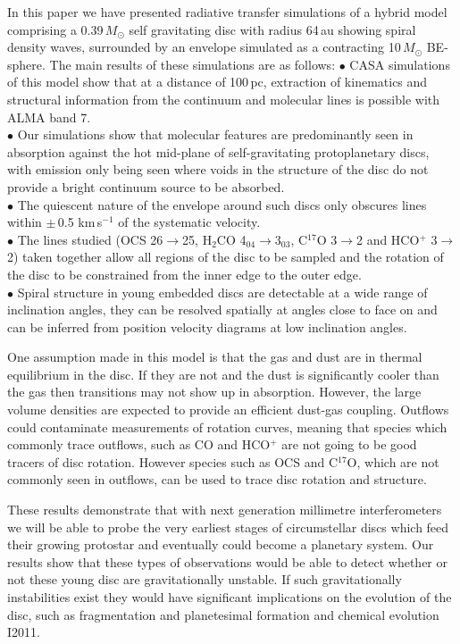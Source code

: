 \documentclass[useAMS,usenatbib]{mn2e}
\begin{document}
In this paper we have presented radiative transfer simulations of a hybrid model comprising a 0.39$\, M_\odot$ self gravitating disc with radius 64$\,$au showing spiral density waves, surrounded by an envelope simulated as a contracting 10$\,M_\odot$ BE-sphere. The main results of these simulations are as follows:\newline
$\bullet$ CASA simulations of this model show that at a distance of 100$\,$pc, extraction of kinematics and structural information from the continuum and molecular lines is possible with ALMA band 7.\\
$\bullet$ Our simulations show that molecular features are predominantly seen in absorption against the hot mid-plane of self-gravitating protoplanetary discs, with emission only being seen where voids in the structure of the disc do not provide a bright continuum source to be absorbed.\\
$\bullet$ The quiescent nature of the envelope around such discs only obscures lines within $\pm\,$0.5 km$\,$s$^{-1}$ of the systematic velocity.\\
$\bullet$ The lines studied (OCS 26$\rightarrow$25, H$_2$CO 4$_{04}$$\rightarrow$3$_{03}$, C$^{17}$O 3$\rightarrow$2 and HCO$^+$ 3$\rightarrow$2) taken together allow all regions of the disc to be sampled and the rotation of the disc to be constrained from the inner edge to the outer edge.\\
$\bullet$ Spiral structure in young embedded discs are detectable at a wide range of inclination angles, they can be resolved spatially at angles close to face on and can be inferred from position velocity diagrams at low inclination angles.\smallskip


One assumption made in this model is that the gas and dust are in thermal equilibrium in the disc. If they are not and the dust is significantly cooler than the gas then transitions may not show up in absorption. However, the large volume densities are expected to provide an efficient dust-gas coupling. Outflows could contaminate measurements of rotation curves, meaning that species  which commonly trace outflows, such as CO and HCO$^+$ are not going to be good tracers of disc rotation. However species such as OCS and C$^{17}$O, which are not commonly seen in outflows, can be used to trace disc rotation and structure.\smallskip

These results demonstrate that with next generation millimetre interferometers we will be able to probe the very earliest stages of circumstellar discs which feed their growing protostar and eventually could become a planetary system. Our results show that these types of observations would be able to detect whether or not these young disc are gravitationally unstable. If such gravitationally instabilities exist they would have significant implications on the evolution of the disc, such as fragmentation and planetesimal formation \citep{Boley2009,Johnson2013,Gibbons2012} and chemical evolution I2011. 
\end{document}
